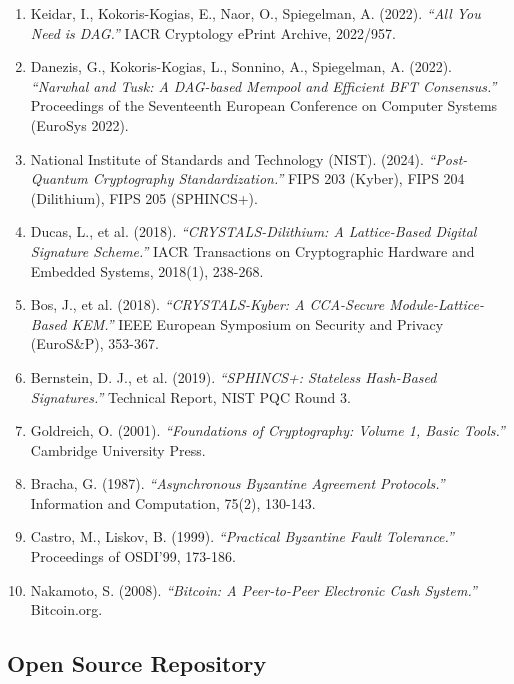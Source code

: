 \documentclass[11pt,a4paper]{scrartcl}
\begin{document}
\begin{enumerate}
\item Keidar, I., Kokoris-Kogias, E., Naor, O., Spiegelman, A. (2022). \textit{``All You Need is DAG.''} IACR Cryptology ePrint Archive, 2022/957.

\item Danezis, G., Kokoris-Kogias, L., Sonnino, A., Spiegelman, A. (2022). \textit{``Narwhal and Tusk: A DAG-based Mempool and Efficient BFT Consensus.''} Proceedings of the Seventeenth European Conference on Computer Systems (EuroSys 2022).

\item National Institute of Standards and Technology (NIST). (2024). \textit{``Post-Quantum Cryptography Standardization.''} FIPS 203 (Kyber), FIPS 204 (Dilithium), FIPS 205 (SPHINCS+).

\item Ducas, L., et al. (2018). \textit{``CRYSTALS-Dilithium: A Lattice-Based Digital Signature Scheme.''} IACR Transactions on Cryptographic Hardware and Embedded Systems, 2018(1), 238-268.

\item Bos, J., et al. (2018). \textit{``CRYSTALS-Kyber: A CCA-Secure Module-Lattice-Based KEM.''} IEEE European Symposium on Security and Privacy (EuroS\&P), 353-367.

\item Bernstein, D. J., et al. (2019). \textit{``SPHINCS+: Stateless Hash-Based Signatures.''} Technical Report, NIST PQC Round 3.

\item Goldreich, O. (2001). \textit{``Foundations of Cryptography: Volume 1, Basic Tools.''} Cambridge University Press.

\item Bracha, G. (1987). \textit{``Asynchronous Byzantine Agreement Protocols.''} Information and Computation, 75(2), 130-143.

\item Castro, M., Liskov, B. (1999). \textit{``Practical Byzantine Fault Tolerance.''} Proceedings of OSDI'99, 173-186.

\item Nakamoto, S. (2008). \textit{``Bitcoin: A Peer-to-Peer Electronic Cash System.''} Bitcoin.org.
\end{enumerate}

\subsection*{Open Source Repository}
\end{document}
